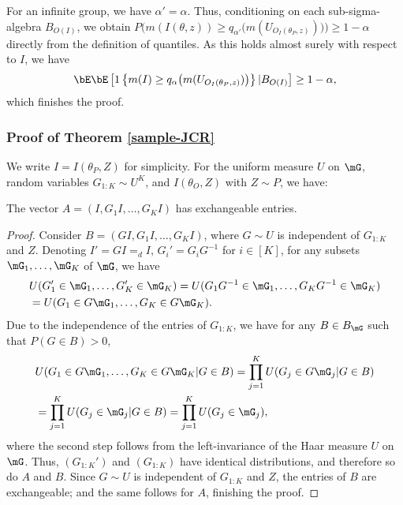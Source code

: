 \documentclass[english]{article}
\begin{document}
For an infinite group, we have $\alpha' = \alpha$. Thus, conditioning on each sub-sigma-algebra $B_{O(I)}$, we obtain
$
P\bigg(m(I(\theta, z)) \ge q_{\alpha'}
\big(  m(U_{O_I(\theta_P,z)}) \big)\bigg) \ge 1 - \alpha
$
directly from the definition of quantiles.
As this holds almost surely with respect to $I$, we have
\begin{align*}
        \bE\bE\left[ 1\left\{m(I) \ge q_{\alpha}\big(  m(U_{O_I(\theta_P,z)}) \big)\right\} | B_{O(I)}\right] \ge 1 - \alpha,
    \end{align*} 
which finishes the proof.

\subsubsection{Proof of Theorem \ref{sample-JCR}}\label{proof:JCR-infinite-group}

We write $I = I(\theta_P,Z)$ 
for simplicity. 
For the uniform measure $U$ on $\mG$, 
random variables $G_{1:K} \sim U^K$, 
and $I(\theta_O,Z)$ with $Z \sim P$, we have:
    \begin{lemma}
        The vector $A = (I,G_1I,\ldots,G_KI)$ has exchangeable entries.
    \end{lemma}
    \begin{proof}
    Consider $B = (GI,G_1I,\ldots,G_KI)$, where $G\sim U$ is
    independent of $G_{1:K}$ and  $Z$. 
    Denoting $I' = GI =_d I$, $G_i' = G_iG^{-1}$ for $i \in [K]$, 
    for any subsets $\mG_1,\ldots,\mG_K$ of $\mG$, we have
        \begin{align*}
            &U(G_1' \in \mG_1,\ldots, G_K' \in \mG_K) =U(G_1G^{-1} \in \mG_1, \ldots, G_KG^{-1} \in \mG_K) \\
            &= U(G_1 \in G\mG_1,\ldots, G_K \in G\mG_K).
        \end{align*}
    Due to the independence of the entries of $G_{1:K}$, we have
    for any $B \in B_\mG$  such that $P(G\in B)>0$,
        \begin{align*}
            &U(G_1 \in G\mG_1,\ldots, G_K \in G\mG_K|G\in B) =
             \prod_{j=1}^K U(G_j \in G\mG_j|G\in B)\\
            &= \prod_{j=1}^K U(G_j \in \mG_j|G\in B)
            = \prod_{j=1}^K U(G_j \in \mG_j),
        \end{align*}
        where the second step follows from the left-invariance of the Haar measure $U$ on $\mG$.
        Thus,  $(G_{1:K}')$ and $(G_{1:K})$ have identical distributions, 
        and therefore so do $A$ and $B$. 
        Since $G \sim U$ is
    independent of $G_{1:K}$ and  $Z$,
    the entries of $B$ are exchangeable; and the same follows for $A$, finishing the proof.
    \end{proof}
    
\end{document}
